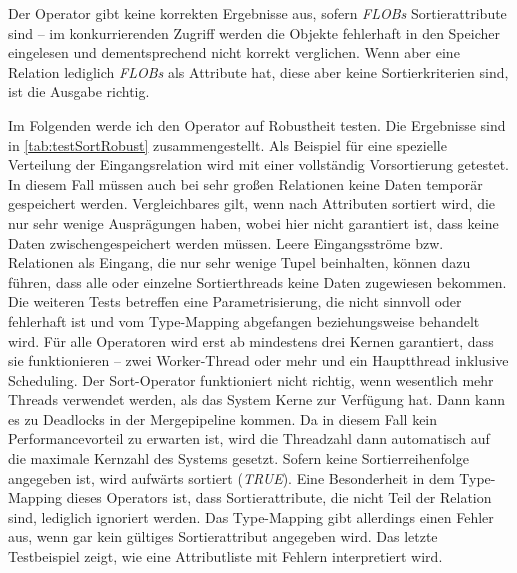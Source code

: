 \documentclass[a4paper,12pt,twoside]{article}
\newcommand{\Fb}[1]{\textit{#1}} %
\begin{document}

Der Operator gibt keine korrekten Ergebnisse aus, sofern \Fb{FLOBs} Sortierattribute sind -- im konkurrierenden Zugriff werden die Objekte fehlerhaft in den Speicher eingelesen und dementsprechend nicht korrekt verglichen. Wenn aber eine Relation lediglich \Fb{FLOBs} als Attribute hat, diese aber keine Sortierkriterien sind, ist die Ausgabe richtig.

Im Folgenden werde ich den Operator auf Robustheit testen. Die Ergebnisse sind in \autoref{tab:testSortRobust} zusammengestellt. Als Beispiel für eine spezielle Verteilung der Eingangsrelation wird mit einer vollständig Vorsortierung getestet. In diesem Fall müssen auch bei sehr großen Relationen keine Daten temporär gespeichert werden. Vergleichbares gilt, wenn nach Attributen sortiert wird, die nur sehr wenige Ausprägungen haben, wobei hier nicht garantiert ist, dass keine Daten zwischengespeichert werden müssen. Leere Eingangsströme bzw. Relationen als Eingang, die nur sehr wenige Tupel beinhalten, können dazu führen, dass alle oder einzelne Sortierthreads keine Daten zugewiesen bekommen. Die weiteren Tests betreffen eine Parametrisierung, die nicht sinnvoll oder fehlerhaft ist und vom Type-Mapping abgefangen beziehungsweise behandelt wird. Für alle Operatoren wird erst ab mindestens drei Kernen garantiert, dass sie funktionieren -- zwei Worker-Thread oder mehr und ein Hauptthread inklusive Scheduling. Der Sort-Operator funktioniert nicht richtig, wenn wesentlich mehr Threads verwendet werden, als das System Kerne zur Verfügung hat. Dann kann es zu Deadlocks in der Mergepipeline kommen. Da in diesem Fall kein Performancevorteil zu erwarten ist, wird die Threadzahl dann automatisch auf die maximale Kernzahl des Systems gesetzt. Sofern keine Sortierreihenfolge angegeben ist, wird aufwärts sortiert (\Fb{TRUE}). Eine Besonderheit in dem Type-Mapping dieses Operators ist, dass Sortierattribute, die nicht Teil der Relation sind, lediglich ignoriert werden. Das Type-Mapping gibt allerdings einen Fehler aus, wenn gar kein gültiges Sortierattribut angegeben wird. Das letzte Testbeispiel zeigt, wie eine Attributliste mit Fehlern interpretiert wird.
\end{document}
